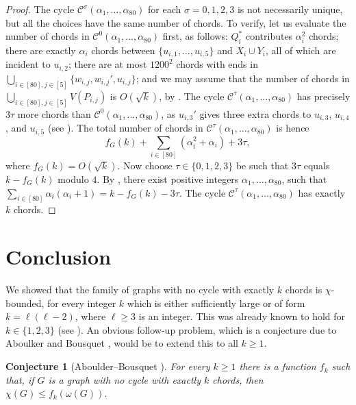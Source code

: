 \documentclass[11pt,english]{article}
\theoremstyle{plain}
\newtheorem{conj}[thm]{Conjecture}
\theoremstyle{definition}
\theoremstyle{remark}
\newcommand{\C}{\mathcal{C}}
\begin{document}
\begin{proof}
        The cycle $\C^\sigma(\alpha_1, \ldots, \alpha_{80})$ for each $\sigma=0,1,2,3$ is not necessarily unique, but all the choices have the same number of chords. 
        To verify, let us evaluate the number of chords in $\C^0(\alpha_1, \ldots, \alpha_{80})$ first, as follows: $Q_i^*$ contributes $\alpha_i^2$ chords; there are exactly $\alpha_i$ chords between $\{u_{i,1}, \ldots, u_{i, 5}\}$ and $X_i \cup Y_i$, all of which are incident to $u_{i,2}$; there are at most $1200^2$ chords with ends in $\bigcup_{i \in [80], j \in [5]} \{w_{i, j}, w_{i,j}', u_{i, j}\}$; and we may assume that the number of chords in $\bigcup_{i \in [80], j \in [5]} V(P_{i, j})$ is $O(\sqrt{k})$, by . 
        The cycle $\C^{\tau}(\alpha_1, \ldots, \alpha_{80})$ has precisely $3\tau$ more chords than $\C^0(\alpha_1, \ldots, \alpha_{80})$, as $u_{i,3}'$ gives three extra chords to $u_{i,3}$, $u_{i,4}$, and $u_{i,5}$ (see ).
        The total number of chords in $\C^{\tau}(\alpha_1, \ldots, \alpha_{80})$ is hence
        \begin{equation*}
            f_G(k) + \sum_{i \in [80]}(\alpha_i^2 + \alpha_i) + 3\tau,
        \end{equation*}
        where $f_G(k) = O(\sqrt{k})$. 
        Now choose $\tau \in \{0, 1, 2, 3\}$ be such that $3\tau$ equals $k - f_G(k)$ modulo $4$. By , there exist positive integers $\alpha_1, \ldots, \alpha_{80}$, such that $\sum_{i \in [80]} \alpha_i(\alpha_i + 1) = k - f_G(k) - 3\tau$. The cycle $\C^{\tau}(\alpha_1, \ldots, \alpha_{80})$ has exactly $k$ chords.
    \end{proof}
    
    
    
\section{Conclusion} \label{sec:conc}
    
    We showed that the family of graphs with no cycle with exactly $k$ chords is $\chi$-bounded, for every integer $k$ which is either sufficiently large or of form $k = \ell(\ell-2)$, where $\ell \ge 3$ is an integer. This was already known to hold for $k \in \{1,2,3\}$ (see \cite{trotignon2010structure,aboulker2015excluding}).
    An obvious follow-up problem, which is a conjecture due to Aboulker and Bousquet \cite{aboulker2015excluding}, would be to extend this to all $k \ge 1$.
    
    \begin{conj}[Aboulder--Bousquet \cite{aboulker2015excluding}]\label{Conjecture_Aboulder_Bousquet}
        For \emph{every} $k \ge 1$ there is a function $f_k$ such that, if $G$ is a graph with no cycle with exactly $k$ chords, then $\chi(G) \le f_k(\omega(G))$.
    \end{conj}
    
\end{document}
